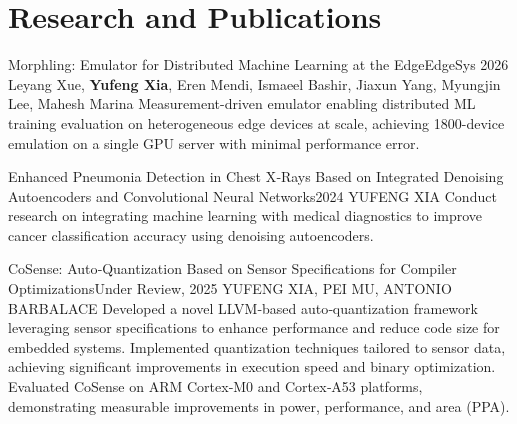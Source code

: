\section{Research and Publications}
  \resumeSubHeadingListStart
    \resumeSubheading
      {Morphling: Emulator for Distributed Machine Learning at the Edge}{EdgeSys 2026}
      {Leyang Xue, \textbf{Yufeng Xia}, Eren Mendi, Ismaeel Bashir, Jiaxun Yang, Myungjin Lee, Mahesh Marina}{}
      \resumeItemListStart
          {Measurement-driven emulator enabling distributed ML training evaluation on heterogeneous edge devices at scale, achieving 1800-device emulation on a single GPU server with minimal performance error.}
      \resumeItemListEnd

    \resumeSubheading
      {Enhanced Pneumonia Detection in Chest X‑Rays Based on Integrated Denoising Autoencoders and Convolutional Neural Networks}{2024}
      {YUFENG XIA}{}
      \resumeItemListStart
          {Conduct research on integrating machine learning with medical diagnostics to improve cancer classification accuracy using denoising autoencoders.}
      \resumeItemListEnd

    \resumeSubheading
      {CoSense: Auto‑Quantization Based on Sensor Specifications for Compiler Optimizations}{Under Review, 2025}
      {YUFENG XIA, PEI MU, ANTONIO BARBALACE}{}
      \resumeItemListStart
          {Developed a novel LLVM‑based auto‑quantization framework leveraging sensor specifications to enhance performance and reduce code size for embedded systems.}
          {Implemented quantization techniques tailored to sensor data, achieving significant improvements in execution speed and binary optimization.}
          {Evaluated CoSense on ARM Cortex‑M0 and Cortex‑A53 platforms, demonstrating measurable improvements in power, performance, and area (PPA).}
      \resumeItemListEnd

  \resumeSubHeadingListEnd